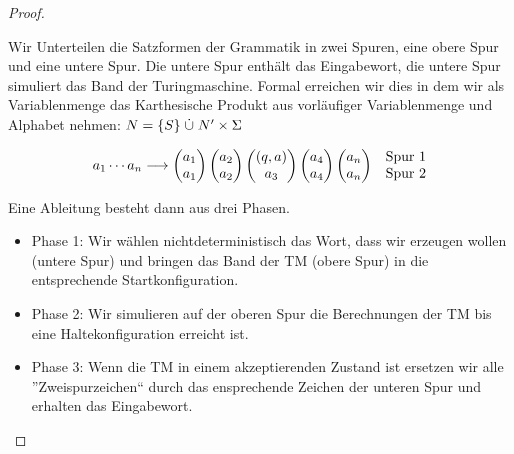 \begin{proof}
\begin{itemize}
\begin{itemize}
	Wir Unterteilen die Satzformen der Grammatik in zwei Spuren, eine obere Spur und eine untere Spur.
	Die untere Spur enthält das Eingabewort, die untere Spur simuliert das Band der Turingmaschine.
	Formal erreichen wir dies in dem wir als Variablenmenge das Karthesische Produkt aus vorläufiger Variablenmenge und Alphabet nehmen:
	$N = \{S\}\mathrel{\dot\cup} N' \times\Sigma$
	
		\begin{align*}
		a_1\cdots a_n &\-->
			\pmqty{a_1\\a_1} \pmqty{a_2\\a_2} \pmqty{(q,a)\\a_3} \pmqty{a_4\\a_4} \pmqty{a_n\\a_n}
			&&\begin{matrix}\text{Spur 1}\\\text{Spur 2}\end{matrix}\\
	\end{align*}
	
	Eine Ableitung besteht dann aus drei Phasen.
	\begin{itemize}
	\item Phase 1: 
	Wir wählen nichtdeterministisch das Wort, dass wir erzeugen wollen (untere Spur) und bringen das Band der \ac{TM} (obere Spur) in die entsprechende Startkonfiguration.
	\item Phase 2:
	Wir simulieren auf der oberen Spur die Berechnungen der \ac{TM} bis eine Haltekonfiguration erreicht ist.
	\item Phase 3:
	Wenn die \ac{TM} in einem akzeptierenden Zustand ist ersetzen wir alle ''Zweispurzeichen`` durch das ensprechende Zeichen der unteren Spur und erhalten das Eingabewort.
	\end{itemize}
	
	
	

\end{itemize}
\end{itemize}
\end{proof}
